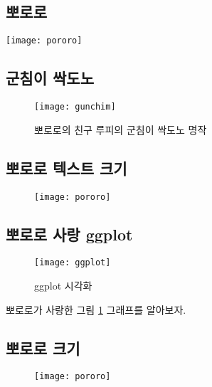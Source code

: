 
\subsection{뽀로로}

\blindtext[1]

\texttt{[image: pororo]}

\subsection{군침이 싹도노}

\blindtext[1]

\begin{SCfigure}[0.5][h]
	\caption{뽀로로의 친구 루피의 군침이 싹도노 명작}
	\texttt{[image: gunchim]}
\end{SCfigure}

\subsection{뽀로로 텍스트 크기}

\blindtext[1]

\begin{wrapfigure}{r}{0.1\textwidth} 
	\texttt{[image: pororo]}
\end{wrapfigure}

\subsection{뽀로로 사랑 ggplot}

\begin{figure}[t]
	\texttt{[image: ggplot]}
	\centering
	\caption{ggplot 시각화 }
	\label{fig:ggplot}
\end{figure}

뽀로로가 사랑한 그림 \ref{fig:ggplot} 그래프를 알아보자.

\subsection{뽀로로 크기}

\blindtext

\begin{wrapfigure}{r}{0.25\textwidth} 
	\centering
	\texttt{[image: pororo]}
\end{wrapfigure}

